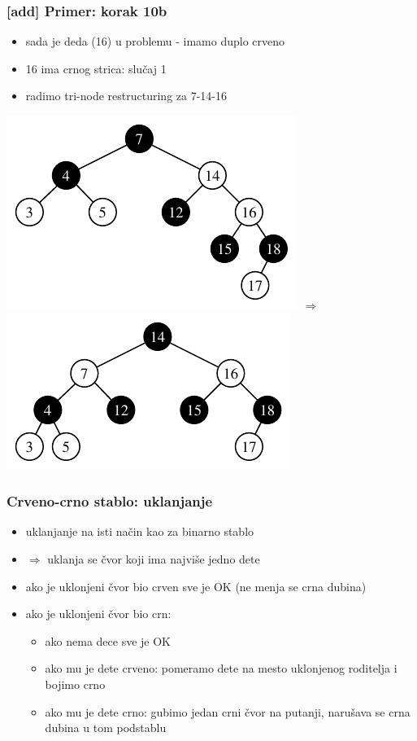 \documentclass[compress]{beamer}
\begin{document}
\begin{frame}[fragile]
  \frametitle{[add] Primer: korak 10b}
  \begin{itemize}
    \item sada je deda (16) u problemu - imamo duplo crveno
    \item 16 ima crnog strica: slučaj 1
    \item radimo tri-node restructuring za 7-14-16
  \end{itemize}
  \begin{center}
    \includegraphics[scale=0.8]{asp-11-add-16.pdf} $\Rightarrow$
    \includegraphics[scale=0.8]{asp-11-add-17.pdf}
  \end{center}
\end{frame}

\begin{frame}[fragile]
  \frametitle{Crveno-crno stablo: uklanjanje}
  \begin{itemize}
    \item uklanjanje na isti način kao za binarno stablo 
    \item $\Rightarrow$ uklanja se čvor koji ima najviše jedno dete
    \item ako je uklonjeni čvor bio crven sve je OK (ne menja se crna dubina)
    \item ako je uklonjeni čvor bio crn:
    \begin{itemize}
      \item ako nema dece sve je OK
      \item ako mu je dete crveno: pomeramo dete na mesto uklonjenog roditelja i bojimo crno
      \item ako mu je dete crno: gubimo jedan crni čvor na putanji, narušava se crna dubina u tom podstablu
    \end{itemize}
  \end{itemize}
\end{frame}
\end{document}
